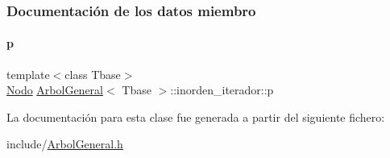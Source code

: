 \subsubsection{Documentación de los datos miembro}
\hypertarget{classArbolGeneral_1_1inorden__iterador_a77d9424a41cf406909fe131c11ccc856}{}\label{classArbolGeneral_1_1inorden__iterador_a77d9424a41cf406909fe131c11ccc856} 
\paragraph{\texorpdfstring{p}{p}}
{\footnotesize\ttfamily template$<$class Tbase$>$ \\
\hyperlink{classArbolGeneral_a12cc1b74a9095d89bc7334290d332f7a}{Nodo} \hyperlink{classArbolGeneral}{Arbol\+General}$<$ Tbase $>$\+::inorden\+\_\+iterador\+::p\hspace{0.3cm}{\ttfamily [private]}}



La documentación para esta clase fue generada a partir del siguiente fichero\+:\begin{DoxyCompactItemize}
\item 
include/\hyperlink{ArbolGeneral_8h}{Arbol\+General.\+h}\end{DoxyCompactItemize}
